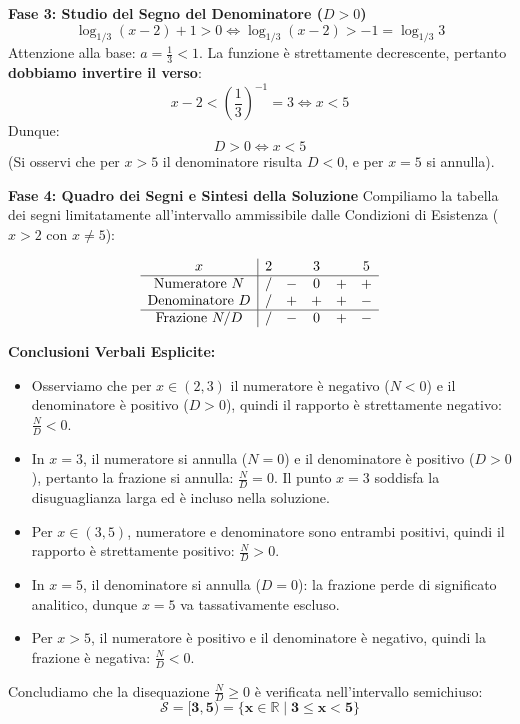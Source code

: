 \documentclass[11pt,a4paper,oneside]{report}
\begin{document}
\begin{dimostrazione}
\vspace{2mm}
\textbf{Fase 3: Studio del Segno del Denominatore ($D > 0$)}
\begin{equation*}
    \log_{1/3}(x - 2) + 1 > 0 \iff \log_{1/3}(x - 2) > -1 = \log_{1/3} 3
\end{equation*}
Attenzione alla base: $a = \frac{1}{3} < 1$. La funzione è strettamente decrescente, pertanto \textbf{dobbiamo invertire il verso}:
\begin{equation*}
    x - 2 < \left(\frac{1}{3}\right)^{-1} = 3 \iff x < 5
\end{equation*}
Dunque:
\begin{equation}
    D > 0 \iff x < 5
\end{equation}
(Si osservi che per $x > 5$ il denominatore risulta $D < 0$, e per $x = 5$ si annulla).

\vspace{2mm}
\textbf{Fase 4: Quadro dei Segni e Sintesi della Soluzione}
Compiliamo la tabella dei segni limitatamente all'intervallo ammissibile dalle Condizioni di Esistenza ($x > 2$ con $x \neq 5$):

\[
\begin{array}{c|ccccc}
x & 2 & & 3 & & 5 \\
\hline
\text{Numeratore } N & \text{\slash} & - & 0 & + & + \\
\text{Denominatore } D & \text{\slash} & + & + & + & - \\
\hline
\text{Frazione } N/D & \text{\slash} & - & 0 & + & - \\
\end{array}
\]

\textbf{Conclusioni Verbali Esplicite:}
\begin{itemize}[leftmargin=*, label=\textbullet]
    \item Osserviamo che per $x \in (2, 3)$ il numeratore è negativo ($N < 0$) e il denominatore è positivo ($D > 0$), quindi il rapporto è strettamente negativo: $\frac{N}{D} < 0$.
    \item In $x = 3$, il numeratore si annulla ($N = 0$) e il denominatore è positivo ($D > 0$), pertanto la frazione si annulla: $\frac{N}{D} = 0$. Il punto $x = 3$ soddisfa la disuguaglianza larga ed è incluso nella soluzione.
    \item Per $x \in (3, 5)$, numeratore e denominatore sono entrambi positivi, quindi il rapporto è strettamente positivo: $\frac{N}{D} > 0$.
    \item In $x = 5$, il denominatore si annulla ($D = 0$): la frazione perde di significato analitico, dunque $x = 5$ va tassativamente escluso.
    \item Per $x > 5$, il numeratore è positivo e il denominatore è negativo, quindi la frazione è negativa: $\frac{N}{D} < 0$.
\end{itemize}
Concludiamo che la disequazione $\frac{N}{D} \ge 0$ è verificata nell'intervallo semichiuso:
\begin{equation}
    \mathbf{\mathcal{S} = [3, 5) = \{x \in \mathbb{R} \mid 3 \le x < 5\}}
\end{equation}
\end{dimostrazione}
\end{document}
